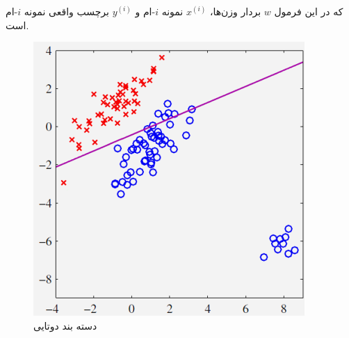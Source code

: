 \documentclass[12pt]{article}
\begin{document}
که در این فرمول \( w \) بردار وزن‌ها، \( x^{(i)} \) نمونه $i$-ام و \( y^{(i)} \) برچسب واقعی نمونه $i$-ام است. 
\begin{figure}
    \centering
    \includegraphics[width=0.5\linewidth]{image3.png}
    \caption{دسته بند دوتایی}
    \label{fig:enter-label}
\end{figure}
\end{document}
